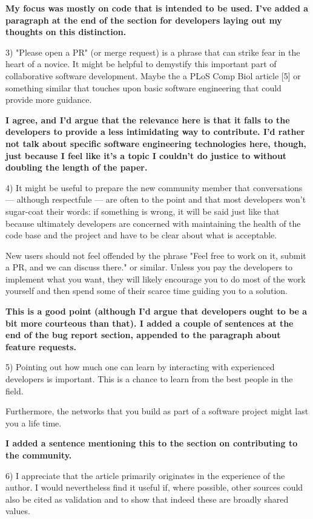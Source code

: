 \documentclass[11pt]{article}
\newcommand{\response}[1]{\textcolor{Mahogany}{\textbf{#1}}}
\begin{document}
\response{My focus was mostly on code that is intended to be used. I've added a
paragraph at the end of the section for developers laying out my thoughts on
this distinction.}

3) "Please open a PR" (or merge request) is a phrase that can strike
fear in the heart of a novice. It might be helpful to demystify
this important part of collaborative software development. Maybe
the a PLoS Comp Biol article [5] or something similar that touches
upon basic software engineering that could provide more guidance.

\response{I agree, and I'd argue that the relevance here is that it falls to the
developers to provide a less intimidating way to contribute. I'd rather not talk
about specific software engineering technologies here, though, just because I
feel like it's a topic I couldn't do justice to without doubling the length of
the paper.}



4) It might be useful to prepare the new community member that
conversations — although respectfule — are often to the point and
that most developers won't sugar-coat their words: if something is
wrong, it will be said just like that because ultimately developers
are concerned with maintaining the health of the code base and the
project and have to be clear about what is acceptable.

New users should not feel offended by the phrase "Feel free to work
on it, submit a PR, and we can discuss there." or similar. Unless
you pay the developers to implement what you want, they will likely
encourage you to do most of the work yourself and then spend some
of their scarce time guiding you to a solution.

\response{This is a good point (although I'd argue that developers ought to be a
bit more courteous than that). I added a couple of sentences at the end of the
bug report section, appended to the paragraph about feature requests.}


5) Pointing out how much one can learn by interacting with experienced
developers is important. This is a chance to learn from the best
people in the field.

Furthermore, the networks that you build as part of a software
project might last you a life time.

\response{I added a sentence mentioning this to the section on contributing to the community.}


6) I appreciate that the article primarily originates in the
experience of the author. I would nevertheless find it useful if,
where possible, other sources could also be cited as validation and
to show that indeed these are broadly shared values.
\end{document}
